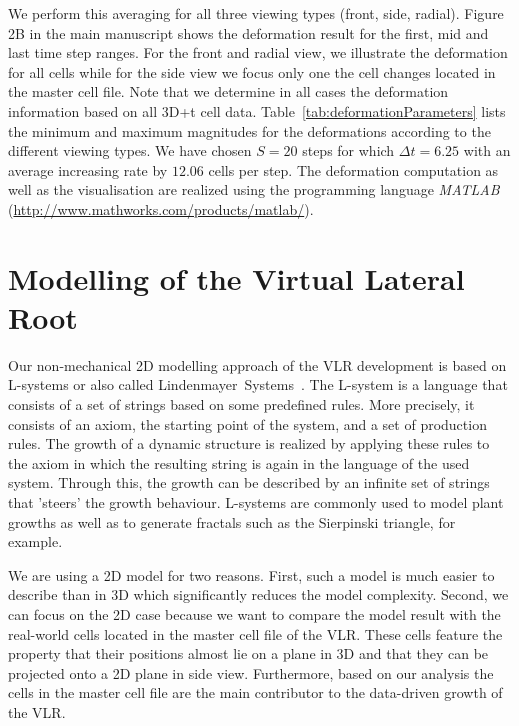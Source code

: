 \documentclass[11pt,a4paper, draft]{article}
\begin{document}
We perform this averaging for all three viewing types (front, side, radial). Figure 2B in the main manuscript shows the deformation result for the first, mid and last time step ranges. For the front and radial view, we illustrate the deformation for all cells while for the side view we focus only one the cell changes located in the master cell file. Note that we determine in all cases the deformation information based on all 3D+t cell data. Table~\ref{tab:deformationParameters} lists the minimum and maximum magnitudes for the deformations according to the different viewing types. We have chosen $S=20$ steps for which $\Delta t = 6.25$ with an average increasing rate by $12.06$ cells per step. The deformation computation as well as the visualisation are realized using the programming language \textit{MATLAB} (\href{http://www.mathworks.com/products/matlab/}{http://www.mathworks.com/products/matlab/}).

\section{Modelling of the Virtual Lateral Root}
\noindent
Our non-mechanical 2D modelling approach of the VLR development is based on L-systems or also called Lindenmayer~Systems~\cite{lindenmayer_1968, prusinkiewicz_lindenmayer_1990}. The L-system is a language that consists of a set of strings based on some predefined rules. More precisely, it consists of an axiom, the starting point of the system, and a set of production rules. The growth of a dynamic structure is realized by applying these rules to the axiom in which the resulting string is again in the language of the used system. Through this, the growth can be described by an infinite set of strings that 'steers' the growth behaviour. L-systems are commonly used to model plant growths as well as to generate fractals such as the Sierpinski triangle, for example.

We are using a 2D model for two reasons. First, such a model is much easier to describe than in 3D which significantly reduces the model complexity. Second, we can focus on the 2D case because we want to compare the model result with the real-world cells located in the master cell file of the VLR. These cells feature the property that their positions almost lie on a plane in 3D and that they can be projected onto a 2D plane in side view. Furthermore, based on our analysis the cells in the master cell file are the main contributor to the data-driven growth of the VLR.
\end{document}
